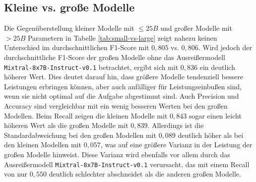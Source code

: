 \subsection*{Kleine vs. große Modelle}

Die Gegenüberstellung kleiner Modelle mit $\leq 25B$ und großer Modelle mit $> 25B$ Parametern in Tabelle \ref{tab:small-vs-large} zeigt nahezu keinen Unterschied im durchschnittlichen F1-Score mit $0{,}805$ vs. $0{,}806$. Wird jedoch der durchschnittliche F1-Score der großen Modelle ohne das Ausreißermodell \texttt{Mixtral-8x7B-Instruct-v0.1} betrachtet, ergibt sich mit $0{,}836$ ein deutlich höherer Wert. Dies deutet darauf hin, dass größere Modelle tendenziell bessere Leistungen erbringen können, aber auch anfälliger für Leistungseinbußen sind, wenn sie nicht optimal auf die Aufgabe abgestimmt sind. Auch Precision und Accuracy sind vergleichbar mit ein wenig besseren Werten bei den großen Modellen. Beim Recall zeigen die kleinen Modelle mit $0{,}843$ sogar einen leicht höheren Wert als die großen Modelle mit $0{,}839$. Allerdings ist die Standardabweichung bei den großen Modellen mit $0{,}089$ deutlich höher als bei den kleinen Modellen mit $0{,}057$, was auf eine größere Varianz in der Leistung der großen Modelle hinweist. Diese Varianz wird ebenfalls vor allem durch das Ausreißermodell \texttt{Mixtral-8x7B-Instruct-v0.1} verursacht, das mit einem Recall von nur $0{,}550$ deutlich schlechter abschneidet als die anderen großen Modelle.


